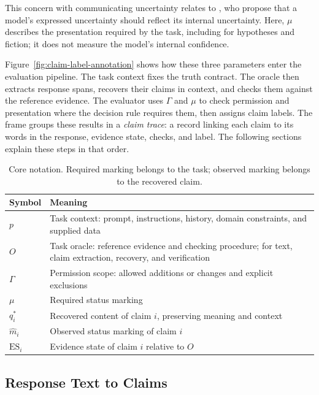 \documentclass{clv2025}
\begin{document}
This concern with communicating uncertainty relates to
\citet{yona_metacognition_2026}, who propose that a model's expressed
uncertainty should reflect its internal uncertainty. Here, $\mu$ describes
the presentation required by the task, including for hypotheses and fiction;
it does not measure the model's internal confidence.

Figure~\ref{fig:claim-label-annotation} shows how these three parameters
enter the evaluation pipeline. The task context fixes the truth contract.
The oracle then extracts response spans, recovers their claims in context,
and checks them against the reference evidence. The evaluator uses
$\Gamma$ and $\mu$ to check permission and presentation where the decision
rule requires them, then assigns claim labels. The frame groups these
results in a \emph{claim trace}: a record linking each claim to its words
in the response, evidence state, checks, and label. The following sections
explain these steps in that order.



\begin{table}[!ht]
\centering\small
\caption{Core notation. Required marking belongs to the task; observed marking belongs to the recovered claim.}
\label{tab:notation}
\begin{tabularx}{\linewidth}{@{}lY@{}}
\toprule
Symbol & Meaning\\\midrule
$p$ & Task context: prompt, instructions, history, domain constraints, and supplied data\\
$O$ & Task oracle: reference evidence and checking procedure; for text, claim extraction, recovery, and verification\\
$\Gamma$ & Permission scope: allowed additions or changes and explicit exclusions\\
$\mu$ & Required status marking\\
$q_i^*$ & Recovered content of claim $i$, preserving meaning and context\\
$\widehat{m}_i$ & Observed status marking of claim $i$\\
$\mathrm{ES}_i$ & Evidence state of claim $i$ relative to $O$\\
\bottomrule
\end{tabularx}
\end{table}


\subsection{Response Text to Claims}\label{subsec:unit}
\end{document}
